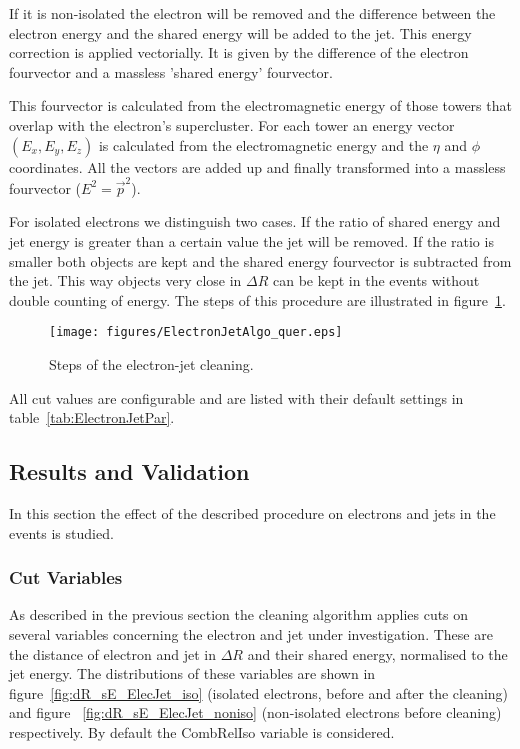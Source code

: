 \documentclass{cmspaper}
\begin{document}
If it is non-isolated the electron will be removed and the difference between
the electron energy and the shared energy will be added to the jet. This energy
correction is applied vectorially. It is given by the difference of the electron
fourvector and a massless 'shared energy' fourvector.

This fourvector is calculated from the electromagnetic energy of those towers
that overlap with the electron's supercluster. For each
tower an energy vector $(E_x, E_y, E_z)$ is calculated from the electromagnetic
energy and the $\eta$ and $\phi$ coordinates. All the vectors are added
up and finally transformed into a massless fourvector ($E^2=\vec{p}^2$).

For isolated electrons we distinguish two cases. If the ratio of shared energy
and jet energy is greater than a certain value the jet will be removed. If the
ratio is smaller both objects are kept and the shared energy fourvector is
subtracted from the jet. This way objects very close in $\Delta R$ can be kept
in the events without double counting of energy.  The steps of this procedure
are illustrated in figure~\ref{fig:EJCleaning}.

\begin{figure}[hbtp]
  \begin{center}
    \texttt{[image: figures/ElectronJetAlgo\_quer.eps]}
    \caption{Steps of the electron-jet cleaning.}
    \label{fig:EJCleaning}
  \end{center}
\end{figure}

All cut values are configurable and are listed with their default settings in
table~\ref{tab:ElectronJetPar}.

\subsection{Results and Validation}
In this section the effect of the described procedure on electrons and jets in
the events is studied. 

\subsubsection{Cut Variables}
As described in the previous section the cleaning algorithm applies cuts on
several variables concerning the electron and jet under investigation. These are
the distance of electron and jet in $\Delta R$ and their shared energy,
normalised to the jet energy. The distributions of these variables are shown
in figure~\ref{fig:dR_sE_ElecJet_iso} (isolated electrons, before and after the
cleaning) and figure ~\ref{fig:dR_sE_ElecJet_noniso} (non-isolated electrons
before cleaning) respectively. By default the CombRelIso variable is considered.
\end{document}
